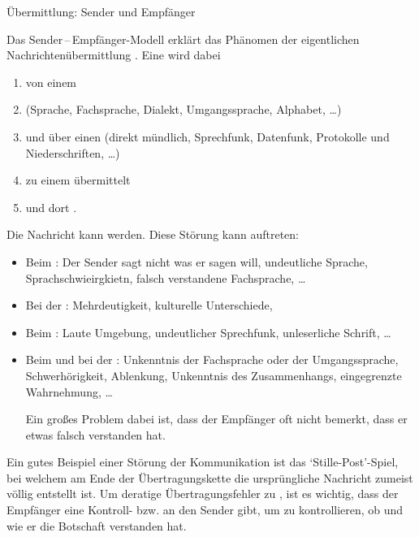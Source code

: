 \documentclass[
ngerman,
paper=a4,
asymmetric,
fontsize=10pt,
draft=false,
numbers=noenddot,
bibtotocnumbered,
footnotes=multiple,
]{scrreprt}
\begin{document}
\Text
{Übermittlung: Sender und Empfänger}
{%
Das Sender\,--\,Empfänger-Modell erklärt das Phänomen der 
eigentlichen Nachrichtenübermittlung \cite{Informatik3}.
Eine  wird dabei 
\begin{enumerate}
  \item von
  einem 
  \item {} (Sprache, Fachsprache, Dialekt,
  Umgangssprache, Alphabet, \ldots)
  \item und über einen  (direkt mündlich,
  Sprechfunk, Datenfunk, Protokolle und Niederschriften, \ldots)
  \item zu einem  übermittelt
  \item und dort .
\end{enumerate}
Die Nachricht kann  werden.
Diese Störung kann auftreten:
\begin{itemize}
  \item Beim : Der Sender sagt nicht was er sagen
  will, undeutliche Sprache, Sprachschwieirgkietn, 
  falsch verstandene Fachsprache, \ldots
  \item Bei der : Mehrdeutigkeit, kulturelle
  Unterschiede,
  \item Beim : Laute Umgebung,
  undeutlicher Sprechfunk, unleserliche Schrift, \ldots
  \item Beim  und bei der :
  Unkenntnis der Fachsprache oder der Umgangssprache, Schwerhörigkeit, Ablenkung, Unkenntnis
  des Zusammenhangs, eingegrenzte Wahrnehmung, \ldots
  
  Ein großes Problem dabei ist, dass der Empfänger oft
  nicht bemerkt, dass er etwas falsch verstanden hat.
\end{itemize}


Ein gutes Beispiel einer Störung der Kommunikation ist das
\enquote*{Stille-Post}-Spiel, bei welchem am Ende der
Übertragungskette die ursprüngliche Nachricht zumeist völlig
entstellt ist. Um deratige Übertragungsfehler zu
, ist es wichtig, dass der Empfänger eine
Kontroll- bzw.  an den Sender gibt, um zu
kontrollieren, ob und wie er die Botschaft verstanden hat.

}
{}
{}
{}
{}

\bigskip 
\end{document}
